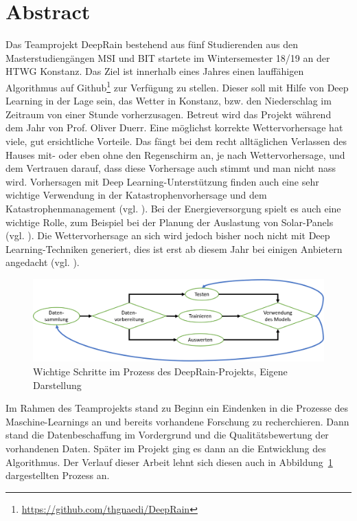 \section{Abstract}
Das Teamprojekt DeepRain bestehend aus fünf Studierenden aus den Masterstudiengängen MSI und BIT startete im Wintersemester 18/19 an der HTWG Konstanz. Das Ziel ist innerhalb eines Jahres einen lauffähigen Algorithmus auf Github\footnote{\url{https://github.com/thgnaedi/DeepRain}} zur Verfügung zu stellen. Dieser soll mit Hilfe von Deep Learning in der Lage sein, das Wetter in Konstanz, bzw. den Niederschlag im Zeitraum von einer Stunde vorherzusagen. Betreut wird das Projekt während dem Jahr von Prof. Oliver Duerr. 
Eine möglichst korrekte Wettervorhersage hat viele, gut ersichtliche Vorteile. Das fängt bei dem recht alltäglichen Verlassen des Hauses mit- oder eben ohne den Regenschirm an, je nach Wettervorhersage, und dem Vertrauen darauf, dass diese Vorhersage auch stimmt und man nicht nass wird. Vorhersagen mit Deep Learning-Unterstützung finden auch eine sehr wichtige Verwendung in der Katastrophenvorhersage und dem Katastrophenmanagement (vgl. \cite[S. 763]{Hanif.2019}). Bei der Energieversorgung spielt es auch eine wichtige Rolle, zum Beispiel bei der Planung der Auslastung von Solar-Panels (vgl. \cite[S. 2]{AndreGensleret.al..}). Die Wettervorhersage an sich wird jedoch bisher noch nicht mit Deep Learning-Techniken generiert, dies ist erst ab diesem Jahr bei einigen Anbietern angedacht (vgl. \cite{ChristophFrohlich.2019}). 
\begin{figure}[ht]
\centering
\includegraphics[width=\linewidth]{pics/Deep_learning_prozess}
\caption[Wichtige Schritte im Prozess des DeepRain-Projekts]{Wichtige Schritte im Prozess des DeepRain-Projekts, Eigene Darstellung}
\label{fig:deepLearningProcess}
\end{figure}
Im Rahmen des Teamprojekts stand zu Beginn ein Eindenken in die Prozesse des Maschine-Learnings an und bereits vorhandene Forschung zu recherchieren. Dann stand die Datenbeschaffung im Vordergrund und die Qualitätsbewertung der vorhandenen Daten. Später im Projekt ging es dann an die Entwicklung des Algorithmus. Der Verlauf dieser Arbeit lehnt sich diesen auch in Abbildung~\ref{fig:deepLearningProcess} dargestellten Prozess an. 


